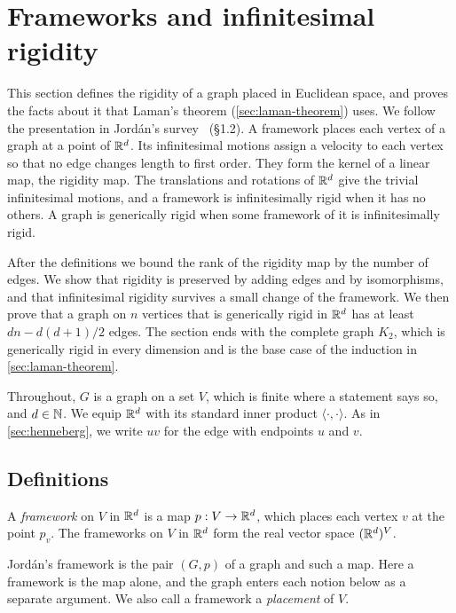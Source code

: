 \section{Frameworks and infinitesimal rigidity}
\label{sec:frameworks}

This section defines the rigidity of a graph placed in Euclidean space,
and proves the facts about it that Laman's theorem
(\cref{sec:laman-theorem}) uses. We follow the presentation in
Jord\'an's survey~\cite{jordan2016} (\S 1.2). A framework places each
vertex of a graph at a point of ${\mathbb{R}}^{d}$. Its infinitesimal motions
assign a velocity to each vertex so that no edge changes length to
first order. They form the kernel of a linear map, the rigidity map.
The translations and rotations of ${\mathbb{R}}^{d}$ give the trivial
infinitesimal motions, and a framework is infinitesimally rigid when it
has no others. A graph is generically rigid when some framework of it
is infinitesimally rigid.

After the definitions we bound the rank of the rigidity map by the
number of edges. We show that rigidity is preserved by adding edges and
by isomorphisms, and that infinitesimal rigidity survives a small
change of the framework. We then prove that a graph on $n$ vertices
that is generically rigid in ${\mathbb{R}}^{d}$ has at least $dn - d(d+1)/2$
edges. The section ends with the complete graph $K_2$, which is
generically rigid in every dimension and is the base case of the
induction in \cref{sec:laman-theorem}.

Throughout, $G$ is a graph on a set $V$, which is finite where a
statement says so, and $d \in {\mathbb{N}}$. We equip ${\mathbb{R}}^{d}$ with its
standard inner product $\langle \cdot, \cdot \rangle$. As in
\cref{sec:henneberg}, we write $uv$ for the edge with endpoints $u$ and
$v$.

\subsection{Definitions}

\begin{definition}[Framework]
  \label{def:framework}
  \leanok
  A \emph{framework} on $V$ in ${\mathbb{R}}^{d}$ is a map $p : V \to {\mathbb{R}}^{d}$,
  which places each vertex $v$ at the point $p_v$. The frameworks on
  $V$ in ${\mathbb{R}}^{d}$ form the real vector space $({\mathbb{R}}^{d})^{V}$.
\end{definition}

Jord\'an's framework is the pair $(G, p)$ of a graph and such a map.
Here a framework is the map alone, and the graph enters each notion
below as a separate argument. We also call a framework a
\emph{placement} of $V$.

